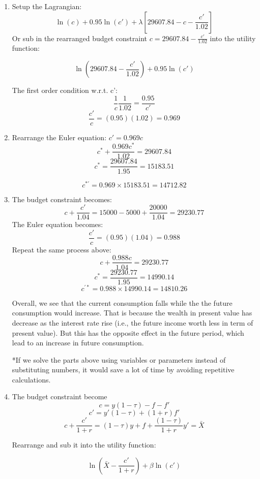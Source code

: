 \documentclass[addpoints,12pt,answers]{exam}
\begin{document}
\begin{enumerate}[label=\textbf{\arabic*.}, itemsep=15pt]
\begin{enumerate}[label=(\alph*)]
			Future period budget constraint: $c' = 20000 +f' (1+0.02)$
			
			Combine the two: $c+\frac{c'}{1+r} = 15000-5000+\frac{20000}{1.02}= 29607.84 =\bar{X}$
			
			\item Setup the Lagrangian:
			\[\ln(c) + 0.95\ln(c') + \lambda \left[ 29607.84 - c - \frac{c'}{1.02} \right]\]
			Or sub in the rearranged budget constraint $c =  29607.84 - \frac{c'}{1.02} $ into the utility function:
			
			\[\ln(29607.84 - \frac{c'}{1.02}) + 0.95\ln(c')\]
			
			The first order condition w.r.t. c':
			\[\frac{1}{c} \frac{1}{1.02} = \frac{0.95}{c'}\]
			\[\frac{c'}{c} = (0.95)(1.02) = 0.969\]
			\item 
			Rearrange the Euler equation: $	c' = 0.969 c$
			\[c^{*} + \frac{0.969c^*}{1.02}  = 29607.84\]			
			\[c^{*}   = \frac{29607.84}{1.95} = 15183.51\]			
			
			\[c^{*'} = 0.969 \times 15183.51 = 14712.82\]
			
			\item The budget constraint becomes: 
			\[c+\frac{c'}{1.04} = 15000-5000+\frac{20000}{1.04} = 29230.77\]
			The Euler equation becomes: 
			\[\frac{c'}{c} = (0.95)(1.04) = 0.988\]
			Repeat the same process above:
			\[c+\frac{0.988c}{1.04} = 29230.77 \]
			\[c^* = \frac{29230.77}{1.95} = 14990.14\]
			\[c^{'*} = 0.988 \times 14990.14 = 14810.26\]
			
			Overall, we see that the current consumption falls while the the future consumption would increase. That is because the wealth in present value has decrease as the interest rate rise (i.e., the future income worth less in term of present value). But this has the opposite effect in the future period, which lead to an increase in future consumption. 
			
			
			*If we solve the parts above using variables or parameters instead of substituting numbers, it would save a lot of time by avoiding repetitive calculations.
			
			\item The budget constraint become
			\[c=y(1-\tau) -f - f'\]
			\[c'=y'(1-\tau) +(1+r) f'\]
			\[c+\frac{c'}{1+r} = (1-\tau)y + f + \frac{(1-\tau)}{1+r} y' = \bar{X}\]
			
			Rearrange and sub it into the utility function:
			
			\[\ln(\bar{X} - \frac{c'}{1+r}) + \beta \ln(c') \]
			

\end{enumerate}
\end{enumerate}
\end{document}
